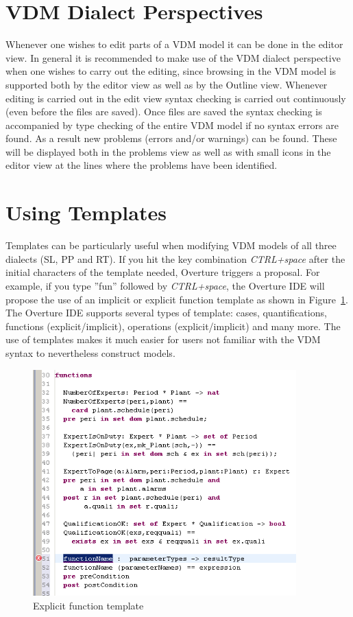 \documentclass{overturerepchap}
\begin{document}
\section{VDM Dialect Perspectives}

Whenever one wishes to edit parts of a VDM model it can be done in the
editor view. In general it is recommended to make use of the VDM
dialect perspective when one wishes to carry out the editing, since
browsing in the VDM model is supported both by the editor view as well
as by the Outline view. Whenever editing is carried out in the edit
view syntax checking is carried out continuously (even before the
files are saved). Once files are saved the syntax checking is
accompanied by type checking of the entire VDM model if no syntax
errors are found. As a result new
problems (errors and/or warnings) can be found. These will be
displayed both in the problems view as well as with small icons in the
editor view at the lines where the problems have been identified.

\section{Using Templates}

Templates can be particularly useful when modifying VDM models of all 
three dialects (SL, PP and RT). If you hit
the key combination \textit{CTRL+space} after the initial characters
of the template needed, Overture triggers a proposal. For example, if
you type ''fun'' followed by \textit{CTRL+space}, the Overture IDE
will propose the use of an implicit or explicit function template as
shown in Figure~\ref{fig:functionTemplate}. The Overture IDE
supports several types of template: cases, quantifications, functions
(explicit/implicit), operations (explicit/implicit) and many
more. The use
of templates makes it much easier for users not familiar
with the VDM syntax to nevertheless construct models.

\begin{figure}
\begin{center}
\includegraphics[width=4in]{figures/FunctionTemplate}
\caption{Explicit function template}
\label{fig:functionTemplate}
\end{center}
\end{figure}
\end{document}
